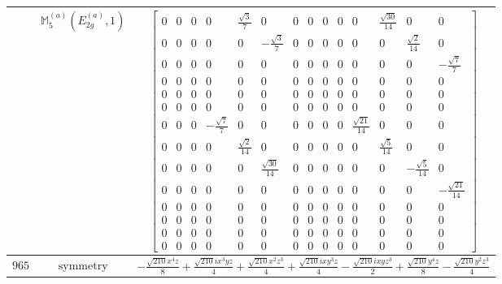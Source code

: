 \documentclass[fleqn,8pt,landscape]{jsarticle}
\begin{document}
\begin{longtable}{ccc}
$  $ & $ \mathbb{M}_{5}^{(a)}(E_{2g}^{(a)},1) $ & $ \begin{bmatrix} 0 & 0 & 0 & 0 & \frac{\sqrt{3}}{7} & 0 & 0 & 0 & 0 & 0 & 0 & \frac{\sqrt{30}}{14} & 0 & 0 \\ 0 & 0 & 0 & 0 & 0 & - \frac{\sqrt{3}}{7} & 0 & 0 & 0 & 0 & 0 & 0 & \frac{\sqrt{2}}{14} & 0 \\ 0 & 0 & 0 & 0 & 0 & 0 & 0 & 0 & 0 & 0 & 0 & 0 & 0 & - \frac{\sqrt{7}}{7} \\ 0 & 0 & 0 & 0 & 0 & 0 & 0 & 0 & 0 & 0 & 0 & 0 & 0 & 0 \\ 0 & 0 & 0 & 0 & 0 & 0 & 0 & 0 & 0 & 0 & 0 & 0 & 0 & 0 \\ 0 & 0 & 0 & 0 & 0 & 0 & 0 & 0 & 0 & 0 & 0 & 0 & 0 & 0 \\ 0 & 0 & 0 & - \frac{\sqrt{7}}{7} & 0 & 0 & 0 & 0 & 0 & 0 & \frac{\sqrt{21}}{14} & 0 & 0 & 0 \\ 0 & 0 & 0 & 0 & \frac{\sqrt{2}}{14} & 0 & 0 & 0 & 0 & 0 & 0 & \frac{\sqrt{5}}{14} & 0 & 0 \\ 0 & 0 & 0 & 0 & 0 & \frac{\sqrt{30}}{14} & 0 & 0 & 0 & 0 & 0 & 0 & - \frac{\sqrt{5}}{14} & 0 \\ 0 & 0 & 0 & 0 & 0 & 0 & 0 & 0 & 0 & 0 & 0 & 0 & 0 & - \frac{\sqrt{21}}{14} \\ 0 & 0 & 0 & 0 & 0 & 0 & 0 & 0 & 0 & 0 & 0 & 0 & 0 & 0 \\ 0 & 0 & 0 & 0 & 0 & 0 & 0 & 0 & 0 & 0 & 0 & 0 & 0 & 0 \\ 0 & 0 & 0 & 0 & 0 & 0 & 0 & 0 & 0 & 0 & 0 & 0 & 0 & 0 \\ 0 & 0 & 0 & 0 & 0 & 0 & 0 & 0 & 0 & 0 & 0 & 0 & 0 & 0 \end{bmatrix} $ \\ \hline
$ 965 $ & $ \text{symmetry} $ & $ - \frac{\sqrt{210} x^{4} z}{8} + \frac{\sqrt{210} i x^{3} y z}{4} + \frac{\sqrt{210} x^{2} z^{3}}{4} + \frac{\sqrt{210} i x y^{3} z}{4} - \frac{\sqrt{210} i x y z^{3}}{2} + \frac{\sqrt{210} y^{4} z}{8} - \frac{\sqrt{210} y^{2} z^{3}}{4} $ \\

\end{longtable}
\end{document}
